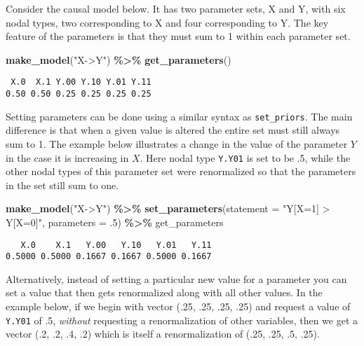 \documentclass[
  12pt,
]{book}
\newenvironment{Shaded}{\begin{snugshade}}{\end{snugshade}}
\newcommand{\AttributeTok}[1]{\textcolor[rgb]{0.13,0.29,0.53}{#1}}
\newcommand{\DecValTok}[1]{\textcolor[rgb]{0.00,0.00,0.81}{#1}}
\newcommand{\FunctionTok}[1]{\textcolor[rgb]{0.13,0.29,0.53}{\textbf{#1}}}
\newcommand{\NormalTok}[1]{#1}
\newcommand{\SpecialCharTok}[1]{\textcolor[rgb]{0.81,0.36,0.00}{\textbf{#1}}}
\newcommand{\StringTok}[1]{\textcolor[rgb]{0.31,0.60,0.02}{#1}}
\begin{document}
Consider the causal model below. It has two parameter sets, X and Y, with six nodal types, two corresponding to X and four corresponding to Y. The key feature of the parameters is that they must sum to 1 within each parameter set.

\begin{Shaded}
\begin{Highlighting}[]
\FunctionTok{make\_model}\NormalTok{(}\StringTok{"X{-}\textgreater{}Y"}\NormalTok{) }\SpecialCharTok{\%\textgreater{}\%} \FunctionTok{get\_parameters}\NormalTok{()}
\end{Highlighting}
\end{Shaded}

\begin{verbatim}
 X.0  X.1 Y.00 Y.10 Y.01 Y.11 
0.50 0.50 0.25 0.25 0.25 0.25 
\end{verbatim}

Setting parameters can be done using a similar syntax as \texttt{set\_priors}. The main difference is that when a given value is altered the entire set must still always sum to 1. The example below illustrates a change in the value of the parameter \(Y\) in the case it is increasing in \(X\). Here nodal type \texttt{Y.Y01} is set to be .5, while the other nodal types of this parameter set were renormalized so that the parameters in the set still sum to one.

\begin{Shaded}
\begin{Highlighting}[]
\FunctionTok{make\_model}\NormalTok{(}\StringTok{"X{-}\textgreater{}Y"}\NormalTok{) }\SpecialCharTok{\%\textgreater{}\%}
  \FunctionTok{set\_parameters}\NormalTok{(}\AttributeTok{statement =} \StringTok{"Y[X=1] \textgreater{} Y[X=0]"}\NormalTok{, }\AttributeTok{parameters =}\NormalTok{ .}\DecValTok{5}\NormalTok{) }\SpecialCharTok{\%\textgreater{}\%}
\NormalTok{  get\_parameters}
\end{Highlighting}
\end{Shaded}

\begin{verbatim}
   X.0    X.1   Y.00   Y.10   Y.01   Y.11 
0.5000 0.5000 0.1667 0.1667 0.5000 0.1667 
\end{verbatim}

Alternatively, instead of setting a particular new value for a parameter you can set a value that then gets renormalized along with all other values. In the example below, if we begin with vector (.25, .25, .25, .25) and request a value of \texttt{Y.Y01} of .5, \emph{without} requesting a renormalization of other variables, then we get a vector (.2, .2, .4, .2) which is itself a renormalization of (.25, .25, .5, .25).
\end{document}
